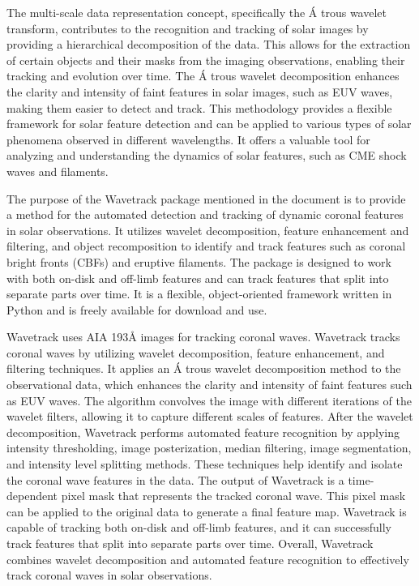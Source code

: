 The multi-scale data representation concept, specifically the \'A trous wavelet transform, contributes to the recognition and tracking of solar images by providing a hierarchical decomposition of the data. This allows for the extraction of certain objects and their masks from the imaging observations, enabling their tracking and evolution over time. The \'A trous wavelet decomposition enhances the clarity and intensity of faint features in solar images, such as EUV waves, making them easier to detect and track. This methodology provides a flexible framework for solar feature detection and can be applied to various types of solar phenomena observed in different wavelengths. It offers a valuable tool for analyzing and understanding the dynamics of solar features, such as CME shock waves and filaments.

The purpose of the Wavetrack package mentioned in the document is to provide a method for the automated detection and tracking of dynamic coronal features in solar observations. It utilizes wavelet decomposition, feature enhancement and filtering, and object recomposition to identify and track features such as coronal bright fronts (CBFs) and eruptive filaments. The package is designed to work with both on-disk and off-limb features and can track features that split into separate parts over time. It is a flexible, object-oriented framework written in Python and is freely available for download and use.

Wavetrack uses AIA 193Å images for tracking coronal waves.
Wavetrack tracks coronal waves by utilizing wavelet decomposition, feature enhancement, and filtering techniques. It applies an \'A trous wavelet decomposition method to the observational data, which enhances the clarity and intensity of faint features such as EUV waves. The algorithm convolves the image with different iterations of the wavelet filters, allowing it to capture different scales of features.
After the wavelet decomposition, Wavetrack performs automated feature recognition by applying intensity thresholding, image posterization, median filtering, image segmentation, and intensity level splitting methods. These techniques help identify and isolate the coronal wave features in the data.
The output of Wavetrack is a time-dependent pixel mask that represents the tracked coronal wave. This pixel mask can be applied to the original data to generate a final feature map. Wavetrack is capable of tracking both on-disk and off-limb features, and it can successfully track features that split into separate parts over time.
Overall, Wavetrack combines wavelet decomposition and automated feature recognition to effectively track coronal waves in solar observations.

